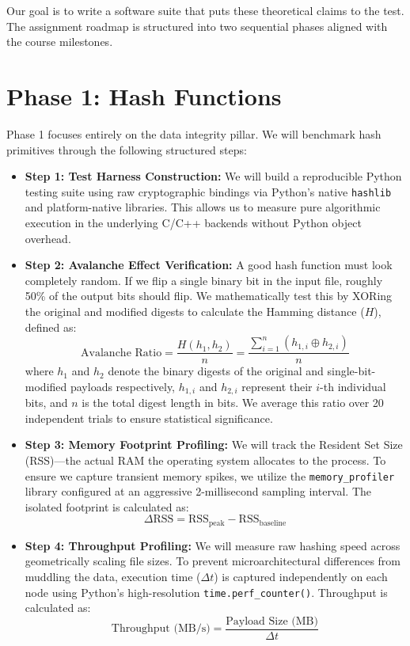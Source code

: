 \documentclass[11pt,a4paper,oneside]{book}
\begin{document}
Our goal is to write a software suite that puts these theoretical claims to the test. The assignment roadmap is structured into two sequential phases aligned with the course milestones.

\section{Phase 1: Hash Functions}
Phase 1 focuses entirely on the data integrity pillar. We will benchmark hash primitives through the following structured steps:
\begin{itemize}
    \item \textbf{Step 1: Test Harness Construction:} We will build a reproducible Python testing suite using raw cryptographic bindings via Python's native \texttt{hashlib} and platform-native libraries. This allows us to measure pure algorithmic execution in the underlying C/C++ backends without Python object overhead.

    \item \textbf{Step 2: Avalanche Effect Verification:} A good hash function must look completely random. If we flip a single binary bit in the input file, roughly 50\% of the output bits should flip. We mathematically test this by XORing the original and modified digests to calculate the Hamming distance ($H$), defined as:
          $$ \text{Avalanche Ratio} = \frac{H(h_1, h_2)}{n} = \frac{\sum_{i=1}^{n} (h_{1,i} \oplus h_{2,i})}{n} $$
          where $h_1$ and $h_2$ denote the binary digests of the original and single-bit-modified payloads respectively, $h_{1,i}$ and $h_{2,i}$ represent their $i$-th individual bits, and $n$ is the total digest length in bits. We average this ratio over 20 independent trials to ensure statistical significance.

    \item \textbf{Step 3: Memory Footprint Profiling:} We will track the Resident Set Size (RSS)---the actual RAM the operating system allocates to the process. To ensure we capture transient memory spikes, we utilize the \texttt{memory\_profiler} library configured at an aggressive 2-millisecond sampling interval. The isolated footprint is calculated as:
          $$ \Delta \text{RSS} = \text{RSS}_{\text{peak}} - \text{RSS}_{\text{baseline}} $$

    \item \textbf{Step 4: Throughput Profiling:} We will measure raw hashing speed across geometrically scaling file sizes. To prevent microarchitectural differences from muddling the data, execution time ($\Delta t$) is captured independently on each node using Python's high-resolution \texttt{time.perf\_counter()}. Throughput is calculated as:
          $$ \text{Throughput (MB/s)} = \frac{\text{Payload Size (MB)}}{\Delta t} $$
\end{itemize}
\end{document}
